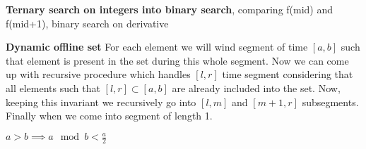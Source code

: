 \documentclass[a4paper,10pt,oneside]{article}
\begin{document}
\begin{multicols}{2}
\textbf{Ternary search on integers into binary search}, comparing f(mid) and f(mid+1), binary search on derivative

\textbf{Dynamic offline set} For each element we will wind segment of time $[a, b]$ such that element is present in the set during this whole segment. Now we can come up with recursive procedure which handles $[l, r]$ time segment considering that all elements such that $[l, r] \subset [a, b]$ are already included into the set. Now, keeping this invariant we recursively go into $[l, m]$ and $[m+1, r]$ subsegments. Finally when we come into segment of length 1.

$a > b \implies a \mod b < \frac{a}{2}$

\end{multicols}
\end{document}
